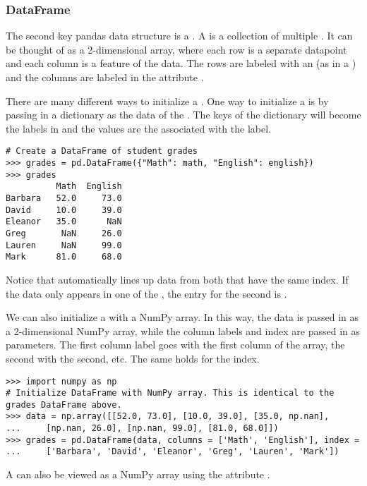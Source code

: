 \subsubsection*{DataFrame}

The second key pandas data structure is a .
A  is a collection of multiple .
It can be thought of as a 2-dimensional array, where each row is a separate datapoint and each column is a feature of the data.
The rows are labeled with an  (as in a ) and the columns are labeled in the attribute .


There are many different ways to initialize a .
One way to initialize a  is by passing in a dictionary as the data of the .
The keys of the dictionary will become the labels in  and the values are the  associated with the label.

\begin{lstlisting}
# Create a DataFrame of student grades
>>> grades = pd.DataFrame({"Math": math, "English": english})
>>> grades
	      Math  English
Barbara   52.0     73.0
David     10.0     39.0
Eleanor   35.0      NaN
Greg       NaN     26.0
Lauren     NaN     99.0
Mark      81.0     68.0
\end{lstlisting}

Notice that  automatically lines up data from both  that have the same index.
If the data only appears in one of the , the entry for the second  is .

We can also initialize a  with a NumPy array.
In this way, the data is passed in as a 2-dimensional NumPy array, while the column labels and index are passed in as parameters.
The first column label goes with the first column of the array, the second with the second, etc.
The same holds for the index.

\begin{lstlisting}
>>> import numpy as np
# Initialize DataFrame with NumPy array. This is identical to the grades DataFrame above.
>>> data = np.array([[52.0, 73.0], [10.0, 39.0], [35.0, np.nan], 
...		[np.nan, 26.0], [np.nan, 99.0], [81.0, 68.0]])
>>> grades = pd.DataFrame(data, columns = ['Math', 'English'], index = 
...		['Barbara', 'David', 'Eleanor', 'Greg', 'Lauren', 'Mark'])
\end{lstlisting}

A  can also be viewed as a NumPy array using the attribute .

